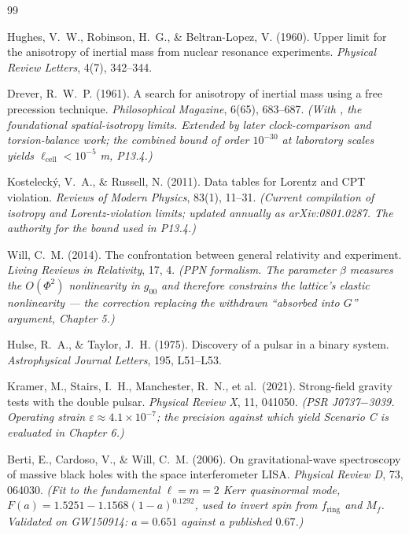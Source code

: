 \documentclass[11pt, letterpaper, openany]{book}
\begin{document}
\begin{thebibliography}{99}

Hughes, V.~W., Robinson, H.~G., \& Beltran-Lopez, V. (1960).
Upper limit for the anisotropy of inertial mass from nuclear resonance experiments.
\textit{Physical Review Letters}, 4(7), 342--344.

Drever, R.~W.~P. (1961).
A search for anisotropy of inertial mass using a free precession technique.
\textit{Philosophical Magazine}, 6(65), 683--687.
\textit{(With \cite{hughes1960}, the foundational spatial-isotropy limits. Extended by later
clock-comparison and torsion-balance work; the combined bound of order $10^{-30}$ at
laboratory scales yields $\ell_{\mathrm{cell}} < 10^{-5}$ m, P13.4.)}

Kosteleck\'y, V.~A., \& Russell, N. (2011).
Data tables for Lorentz and CPT violation.
\textit{Reviews of Modern Physics}, 83(1), 11--31.
\textit{(Current compilation of isotropy and Lorentz-violation limits; updated annually as
arXiv:0801.0287. The authority for the bound used in P13.4.)}


Will, C.~M. (2014).
The confrontation between general relativity and experiment.
\textit{Living Reviews in Relativity}, 17, 4.
\textit{(PPN formalism. The parameter $\beta$ measures the $O(\Phi^2)$ nonlinearity in
$g_{00}$ and therefore constrains the lattice's elastic nonlinearity --- the correction
replacing the withdrawn ``absorbed into $G$'' argument, Chapter 5.)}

Hulse, R.~A., \& Taylor, J.~H. (1975).
Discovery of a pulsar in a binary system.
\textit{Astrophysical Journal Letters}, 195, L51--L53.

Kramer, M., Stairs, I.~H., Manchester, R.~N., et al.\ (2021).
Strong-field gravity tests with the double pulsar.
\textit{Physical Review X}, 11, 041050.
\textit{(PSR J0737$-$3039. Operating strain $\varepsilon \approx 4.1\times10^{-7}$; the
precision against which yield Scenario C is evaluated in Chapter 6.)}

Berti, E., Cardoso, V., \& Will, C.~M. (2006).
On gravitational-wave spectroscopy of massive black holes with the space interferometer LISA.
\textit{Physical Review D}, 73, 064030.
\textit{(Fit to the fundamental $\ell=m=2$ Kerr quasinormal mode,
$F(a) = 1.5251 - 1.1568(1-a)^{0.1292}$, used to invert spin from $f_{\mathrm{ring}}$ and
$M_f$. Validated on GW150914: $a = 0.651$ against a published $0.67$.)}


\end{thebibliography}
\end{document}

